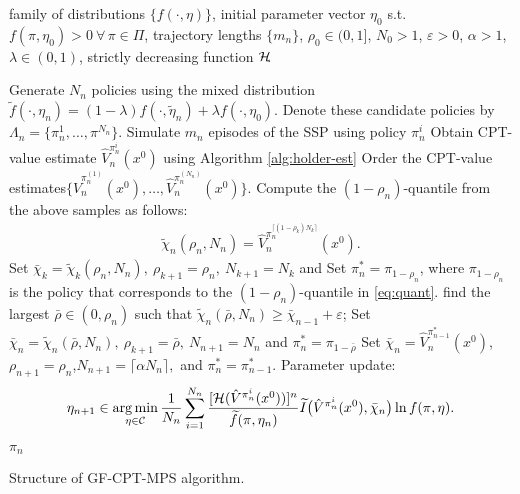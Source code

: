 \documentclass[11pt,letterpaper,english]{article}
\begin{document}
\begin{algorithm}
\begin{algorithmic}
  family of distributions $\{f(\cdot,\eta)\}$, initial parameter vector $\eta_0$ s.t. $f(\pi,\eta_0)>0 ~\forall\, \pi\in \Pi$, trajectory lengths $\{m_n\}$, 
$\rho_0 \in (0,1]$, $N_0>1$,
$\varepsilon> 0$, $\alpha>1$, $\lambda \in(0,1)$,
strictly decreasing function
$\mathcal{H}\hspace*{-3pt}$.

	\Candidate
	    \State 
	    Generate $N_n$ policies using the mixed distribution $\widetilde f(\cdot,\eta_n)= (1-\lambda)f(\cdot,\widetilde\eta_n)+\lambda f(\cdot,\eta_0)$. 
	    \State Denote these candidate policies by $\Lambda_n=\{\pi^1_n, \ldots, \pi^{N_n}\}$.
	\EndCandidate    
	\Estimation
	      \State Simulate $m_n$ episodes of the SSP using policy $\pi^i_n$
	      \State Obtain CPT-value estimate $\widehat V_n^{\pi^i_n}(x^0)$ using Algorithm \ref{alg:holder-est}
	      \EndFor
	\EndEstimation
	\Elite
	  \State Order the CPT-value estimates\footnotemark[1] $\{\widehat V_n^{\pi^{(1)}_n}(x^0),\ldots,\widehat V_n^{\pi^{(N_n)}_n}(x^0)\}$. 
	  \State Compute the $(1-\rho_n)$-quantile from the above samples as follows: 
	  \begin{align}
\widetilde \chi_{n}(\rho_n,N_n) = \widehat V_n^{\pi^{\lceil(1-\rho_k)N_k \rceil}_n}(x^0).\label{eq:quant}
\end{align}
	\EndElite
	\Thresholding
	    \State Set $\bar \chi_{k} = \widetilde \chi_{k}(\rho_n,N_n),~\rho_{k+1} = \rho_n,~N_{k+1} = N_{k}$ and \label{step:3a}
	    \State Set $\pi^*_{n} = \pi_{1-\rho_{n}}$, where $\pi_{1-\rho_{n}}$ is the policy that corresponds to the $(1-\rho_n)$-quantile in \eqref{eq:quant}.
	\Else
             \State find the largest $\bar \rho \in (0, \rho_n)$ such that $\widetilde\chi_{n}(\bar \rho,N_n)\geq \bar\chi_{n-1}+\varepsilon$;             
              \State Set $\bar \chi_{n} = \widetilde \chi_{n}(\bar \rho,N_n),~ \rho_{k+1}  = \bar \rho,~N_{n+1} = N_{n}$ and
              $\pi^*_{n} = \pi_{1- \bar \rho}$ \label{step:3b}
              \Else
	      \State Set $\bar \chi_{n}  = \widehat V_n^{\pi^*_{n-1}}(x^0)$,$\rho_{n+1} = \rho_n$,$N_{n+1} = \lceil\alpha N_{n}\rceil,$ and
          $\pi^*_{n} = \pi^*_{n-1}$.\label{step:3c}
	      \EndIf
         \EndIf
	\EndThresholding
	    \Update
		\State Parameter update\footnotemark[2]:  
		                         \begin{equation*} 
\eta_{n+1} \in \mathop{\rm arg\,min}_{\eta \in \mathcal{C}}\frac{1}{N_n}\sum_{i=1}^{N_n}\frac{[\mathcal{H}(\hat V^{\pi^i_n}(x^0))]^n}{\widetilde f(\pi,\eta_n)}
\widetilde I\big(\hat V^{\pi^i_n}(x^0),\bar \chi_{n}\big) \ln f(\pi,\eta).
                            \end{equation*}

		\EndUpdate
\EndFor
{} $\pi_n$
\end{algorithmic}
\caption{Structure of  GF-CPT-MPS algorithm.}
\label{alg:mras}
\end{algorithm}
\end{document}
